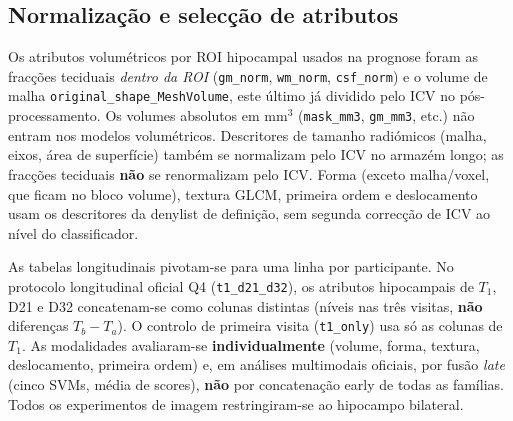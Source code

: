 \documentclass[review]{elsarticle}
\newcommand{\code}[1]{\texttt{#1}}
\begin{document}
\subsection{Normalização e selecção de atributos}
\label{sec:feature-selection}

Os atributos volumétricos por ROI hipocampal usados na prognose foram as fracções teciduais \emph{dentro da ROI} (\code{gm\_norm}, \code{wm\_norm}, \code{csf\_norm}) e o volume de malha \code{original\_shape\_MeshVolume}, este último já dividido pelo ICV no pós-processamento.
Os volumes absolutos em mm$^3$ (\code{mask\_mm3}, \code{gm\_mm3}, etc.) não entram nos modelos volumétricos.
Descritores de tamanho radiómicos (malha, eixos, área de superfície) também se normalizam pelo ICV no armazém longo; as fracções teciduais \textbf{não} se renormalizam pelo ICV.
Forma (exceto malha/voxel, que ficam no bloco volume), textura GLCM, primeira ordem e deslocamento usam os descritores da denylist de definição, sem segunda correcção de ICV ao nível do classificador.

As tabelas longitudinais pivotam-se para uma linha por participante.
No protocolo longitudinal oficial Q4 (\code{t1\_d21\_d32}), os atributos hipocampais de $T_1$, D21 e D32 concatenam-se como colunas distintas (níveis nas três visitas, \textbf{não} diferenças $T_b-T_a$).
O controlo de primeira visita (\code{t1\_only}) usa só as colunas de $T_1$.
As modalidades avaliaram-se \textbf{individualmente} (volume, forma, textura, deslocamento, primeira ordem) e, em análises multimodais oficiais, por fusão \emph{late} (cinco SVMs, média de scores), \textbf{não} por concatenação early de todas as famílias.
Todos os experimentos de imagem restringiram-se ao hipocampo bilateral.
\end{document}

